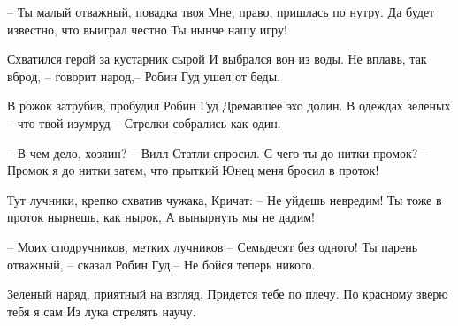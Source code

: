 \begin{flushleft}
– Ты малый отважный, повадка твоя \linebreak
Мне, право, пришлась по нутру. \linebreak
Да будет известно, что выиграл честно \linebreak
Ты нынче нашу игру! \linebreak

Схватился герой за кустарник сырой \linebreak
И выбрался вон из воды. \linebreak
Не вплавь, так вброд, – говорит народ,– \linebreak
Робин Гуд ушел от беды. \linebreak

В рожок затрубив, пробудил Робин Гуд \linebreak
Дремавшее эхо долин. \linebreak
В одеждах зеленых – что твой изумруд – \linebreak
Стрелки собрались как один. \linebreak

– В чем дело, хозяин? – Вилл Статли спросил. \linebreak
С чего ты до нитки промок? \linebreak
– Промок я до нитки затем, что прыткий \linebreak
Юнец меня бросил в проток! \linebreak

Тут лучники, крепко схватив чужака, \linebreak
Кричат: – Не уйдешь невредим! \linebreak
Ты тоже в проток нырнешь, как нырок, \linebreak
А вынырнуть мы не дадим! \linebreak

– Моих сподручников, метких лучников – \linebreak
Семьдесят без одного! \linebreak
Ты парень отважный, – сказал Робин Гуд.– \linebreak
Не бойся теперь никого. \linebreak

\newpage

Зеленый наряд, приятный на взгляд, \linebreak
Придется тебе по плечу. \linebreak
По красному зверю тебя я сам \linebreak
Из лука стрелять научу. \linebreak


\end{flushleft}
